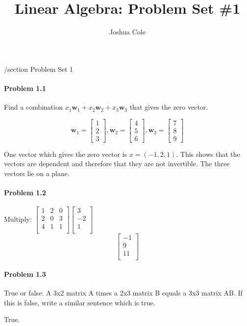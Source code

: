 \documentclass {article}
\begin{document}
\title{Linear Algebra: Problem Set \#1}
\author{Joshua Cole}
\maketitle

/section {Problem Set 1}
\paragraph {Problem 1.1}
Find a combination $x_1 \textbf{w}_1 + x_2 \textbf{w}_2 + x_3 \textbf{w}_3$ that gives the zero vector.

$$ \textbf{w}_1 = \begin{bmatrix} 1 \\ 2 \\ 3\end{bmatrix},  \textbf{w}_2 =\begin{bmatrix} 4 \\ 5 \\ 6\end{bmatrix},  \textbf{w}_3 = \begin{bmatrix} 7 \\ 8 \\ 9\end{bmatrix}$$

One vector which gives the zero vector is $x = (-1, 2, 1)$. This shows that the vectors are dependent and therefore that they are not invertible. The three vectors lie on a plane.

\paragraph {Problem 1.2}Multiply: $
\begin{bmatrix}
   1 & 2 & 0 \\
   2 & 0 & 3 \\
   4 & 1 & 1 \\
\end{bmatrix}
\begin{bmatrix}
   3 \\
   -2 \\
   1 \\
\end{bmatrix}
$
$$
\begin{bmatrix}
   -1\\
   9 \\
   11 \\
\end{bmatrix}
$$
\paragraph {Problem 1.3}
True or false: A 3x2 matrix A times a 2x3 matrix B equals a 3x3 matrix AB. If this is false, write a similar sentence which is true.

True.
\end{document}
